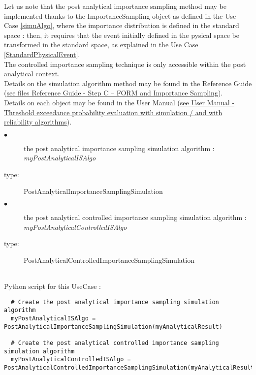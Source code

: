 Let us note that the post analytical importance sampling method may be implemented thanks to the ImportanceSampling object as defined in the Use Case \ref{simuAlgo}, where the importance distribution is defined in the standard space : then, it requires that the event initially defined in the pysical space be transformed in the standard space, as explained in the Use Case \ref{StandardPhysicalEvent}.\\
The controlled importance sampling technique is only accessible within the post analytical context.\\



Details on the simulation algorithm method may be found in the Reference Guide (\href{OpenTURNS_ReferenceGuide.pdf}{see files Reference Guide - Step C -- FORM and Importance Sampling}).\\

Details on each object may be found in the User Manual  (\href{OpenTURNS_UserManual_TUI.pdf}{see User Manual - Threshold exceedance probability evaluation with simulation / and with reliability algorithms}).\\

{
  \begin{description}
  \item[$\bullet$] the post analytical importance sampling simulation algorithm : {\itshape myPostAnalyticalISAlgo}
  \item[type:] PostAnalyticalImportanceSamplingSimulation
  \item[$\bullet$] the post analytical controlled importance sampling simulation algorithm : {\itshape myPostAnalyticalControlledISAlgo}
  \item[type:] PostAnalyticalControlledImportanceSamplingSimulation
  \end{description}
}


\textspace\\
Python script for this UseCase :

\begin{lstlisting}
  # Create the post analytical importance sampling simulation algorithm
  myPostAnalyticalISAlgo = PostAnalyticalImportanceSamplingSimulation(myAnalyticalResult)

  # Create the post analytical controlled importance sampling simulation algorithm
  myPostAnalyticalControlledISAlgo = PostAnalyticalControlledImportanceSamplingSimulation(myAnalyticalResult)
\end{lstlisting}
